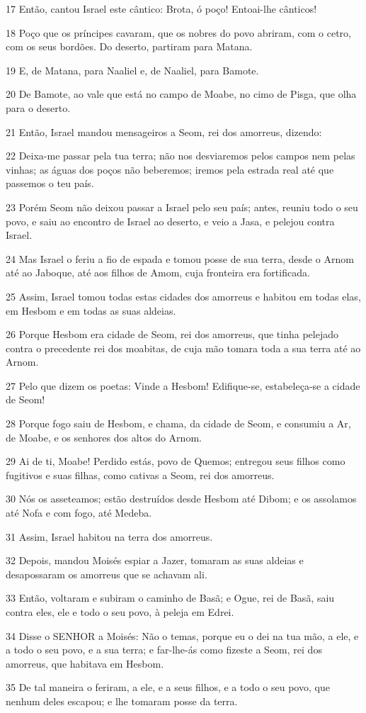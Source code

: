 \par 17 Então, cantou Israel este cântico: Brota, ó poço! Entoai-lhe cânticos!
\par 18 Poço que os príncipes cavaram, que os nobres do povo abriram, com o cetro, com os seus bordões. Do deserto, partiram para Matana.
\par 19 E, de Matana, para Naaliel e, de Naaliel, para Bamote.
\par 20 De Bamote, ao vale que está no campo de Moabe, no cimo de Pisga, que olha para o deserto.
\par 21 Então, Israel mandou mensageiros a Seom, rei dos amorreus, dizendo:
\par 22 Deixa-me passar pela tua terra; não nos desviaremos pelos campos nem pelas vinhas; as águas dos poços não beberemos; iremos pela estrada real até que passemos o teu país.
\par 23 Porém Seom não deixou passar a Israel pelo seu país; antes, reuniu todo o seu povo, e saiu ao encontro de Israel ao deserto, e veio a Jasa, e pelejou contra Israel.
\par 24 Mas Israel o feriu a fio de espada e tomou posse de sua terra, desde o Arnom até ao Jaboque, até aos filhos de Amom, cuja fronteira era fortificada.
\par 25 Assim, Israel tomou todas estas cidades dos amorreus e habitou em todas elas, em Hesbom e em todas as suas aldeias.
\par 26 Porque Hesbom era cidade de Seom, rei dos amorreus, que tinha pelejado contra o precedente rei dos moabitas, de cuja mão tomara toda a sua terra até ao Arnom.
\par 27 Pelo que dizem os poetas: Vinde a Hesbom! Edifique-se, estabeleça-se a cidade de Seom!
\par 28 Porque fogo saiu de Hesbom, e chama, da cidade de Seom, e consumiu a Ar, de Moabe, e os senhores dos altos do Arnom.
\par 29 Ai de ti, Moabe! Perdido estás, povo de Quemos; entregou seus filhos como fugitivos e suas filhas, como cativas a Seom, rei dos amorreus.
\par 30 Nós os asseteamos; estão destruídos desde Hesbom até Dibom; e os assolamos até Nofa e com fogo, até Medeba.
\par 31 Assim, Israel habitou na terra dos amorreus.
\par 32 Depois, mandou Moisés espiar a Jazer, tomaram as suas aldeias e desapossaram os amorreus que se achavam ali.
\par 33 Então, voltaram e subiram o caminho de Basã; e Ogue, rei de Basã, saiu contra eles, ele e todo o seu povo, à peleja em Edrei.
\par 34 Disse o SENHOR a Moisés: Não o temas, porque eu o dei na tua mão, a ele, e a todo o seu povo, e a sua terra; e far-lhe-ás como fizeste a Seom, rei dos amorreus, que habitava em Hesbom.
\par 35 De tal maneira o feriram, a ele, e a seus filhos, e a todo o seu povo, que nenhum deles escapou; e lhe tomaram posse da terra.

